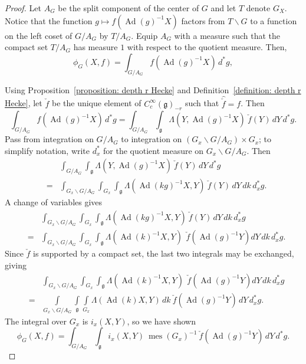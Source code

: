 \documentclass[11pt]{amsart}
\theoremstyle{definition}
\theoremstyle{remark}
\numberwithin{equation}{theorem}
\def\GF{{G}}
\def\AG{{A_G}}
\def\TF{{T}}
\def\gF{{\mathfrak{g}}}
\def\orbint{{\phi}}
\def\kill#1#2{{\Lambda\left({#1},{#2}\right)}}
\def\i{{i}}
\def\Sch#1{{C^\infty_c(#1)}}
\def\Ad{{\rm Ad}}
\def\rightcoset{{ / }}
\def\leftcoset{{\backslash}}
\def\meas{{\operatorname{mes}}}
\def\Ad{\operatorname{Ad}}
\begin{document}
\begin{proof}
Let $\AG$ be the split component of the center of $\GF$ and let
$\TF$ denote $\GF_X$. Notice that the function $g\mapsto
f(\Ad(g)^{-1}X)$ factors from $\TF\leftcoset\GF$ to a function on
the left coset of $\GF\rightcoset\AG$ by $\TF\rightcoset\AG$.
Equip $\AG$ with a measure such that the compact set
$\TF\rightcoset\AG$ has measure $1$ with respect to the quotient
measure. Then,
\begin{equation}
\orbint_\GF(X,f) = \int_{\GF\rightcoset\AG} f(\Ad(g)^{-1}X)\, d^*g,
\end{equation}

Using Proposition~\ref{proposition: depth r Hecke} and
Definition~\ref{definition: depth r Hecke}, let $\check{f}$ be the
unique element of $\Sch{\gF}_{-r}$ such that $\widehat{\check{f}}
= f$. Then
\begin{equation}
\int_{\GF\rightcoset\AG} f(\Ad(g)^{-1}X)\, d^*g =
\int_{\GF\rightcoset\AG} \int_\gF
        \kill{Y}{\Ad(g)^{-1}X}\ \check{f}(Y)
                        \, dY\, d^*g.
\end{equation}
Pass from integration on $\GF\rightcoset\AG$ to integration on
$(\GF_x\leftcoset\GF\rightcoset\AG) \times \GF_x$; to simplify
notation, write $d_x^*$ for the quotient measure on
$\GF_x\leftcoset\GF\rightcoset\AG$. Then
\begin{eqnarray*}
&&
\int_{\GF\rightcoset\AG} \int_\gF
        \kill{Y}{\Ad(g)^{-1}X}\ \check{f}(Y)
                        \, dY\, d^*g\\
 &=& \int_{\GF_x\leftcoset\GF\rightcoset\AG} \int_{\GF_x}
\int_{\gF}
        \kill{\Ad(kg)^{-1}X}{Y}\ \check{f}(Y)
                \, dY\, dk\, d_x^*g.
\end{eqnarray*}
A change of variables gives
\begin{eqnarray*}
&&    \int_{\GF_x\leftcoset\GF\rightcoset\AG} \int_{\GF_x}
\int_{\gF}
        \kill{\Ad(kg)^{-1}X}{Y}\ \check{f}(Y)
                \, dY\, dk\, d_x^*g\\
    &=& \int_{\GF_x\leftcoset\GF\rightcoset\AG}
    \int_{\GF_x} \int_{\gF} \kill{\Ad(k)^{-1}X}{Y}\ \,
    \check{f}(\Ad(g)^{-1}Y) dY\, dk\, d_x^*g.
\end{eqnarray*}
Since $\check{f}$ is supported by a compact set, the last two
integrals may be exchanged, giving
\begin{eqnarray*}
&& \int_{\GF_x\leftcoset\GF\rightcoset\AG}
    \int_{\GF_x} \int_{\gF} \kill{\Ad(k)^{-1}X}{Y}\ \,
    \check{f}(\Ad(g)^{-1}Y) dY\, dk\, d_x^*g\\
     &=& \int\limits_{\GF_x\leftcoset\GF\rightcoset\AG}
\int\limits_{\gF} \int\limits_{\GF_x} \kill{\Ad(k)X}{Y}\, dk\
\check{f}(\Ad(g)^{-1}Y)\, dY\, d_x^*g.
\end{eqnarray*}
The integral over $\GF_x$ is $\i_x(X,Y)$, so we have shown
\begin{equation}
\orbint_\GF(X,f) =
        \int_{\GF\rightcoset\AG}\int_{\gF}
         \i_x(X,Y)\ \meas(\GF_x)^{-1}\ \check{f}(\Ad(g)^{-1}Y)
                \, dY\, d^*g.
\end{equation}


\end{proof}
\end{document}

